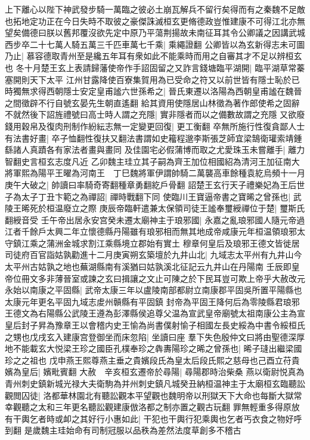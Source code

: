 上下離心以陛下神武發步騎一萬臨之彼必土崩瓦解兵不留行矣得而有之秦魏不足敵也拓地定功正在今日失時不取彼之豪傑誅滅桓玄更脩德政豈惟建康不可得江北亦無望矣備德曰朕以舊邦覆沒欲先定中原乃平蕩荆揚故未南征耳其令公卿議之因講武城西步卒二十七萬人騎五萬三千匹車萬七千乘|{
	乘繩證翻}
公卿皆以為玄新得志未可圖乃止|{
	慕容德取青州至是纔五年耳有衆如此不能乘時而用之自審其才不足以辨桓玄也}
冬十月楚王玄上表請歸藩使帝作手詔固留之又詐言錢塘臨平湖開|{
	臨平湖草常蓁塞開則天下太平}
江州甘露降使百寮集賀用為已受命之符又以前世皆有隱士恥於已時獨無求得西朝隱士安定皇甫謐六世孫希之|{
	晉氏東遷以洛陽為西朝皇甫謐在魏晉之間徵辟不行自號玄晏先生朝直遙翻}
給其資用使隱居山林徵為著作郎使希之固辭不就然後下詔旌禮號曰高士時人謂之充隱|{
	實非隱者而以之備數故謂之充隱}
又欲廢錢用穀帛及復肉刑制作紛紜志無一定變更回復|{
	更工衡翻}
卒無所施行性復貪鄙人士有法書好畫|{
	卒子恤翻性復扶又翻法書謂如史籕程邈李斯張芝師宜梁鵠衛瓘索靖鍾繇諸人真蹟各有家法者畫與畫同}
及佳園宅必假蒲博而取之尤愛珠玉未嘗離手|{
	離力智翻史言桓玄志度凡近}
乙卯魏主珪立其子嗣為齊王加位相國紹為清河王加征南大將軍熙為陽平王曜為河南王　丁巳魏將軍伊謂帥騎二萬襲高車餘種袁紇烏頻十一月庚午大破之|{
	帥讀曰率騎奇寄翻種章勇翻紇戶骨翻}
詔楚王玄行天子禮樂妃為王后世子為太子丁丑卞範之為禪詔|{
	禪時戰翻下同}
使臨川王寶逼帝書之寶晞之曾孫也|{
	武陵王晞死於桓温廢立之際}
庚辰帝臨軒遣兼太保領司徒王謐奉璽綬禪位于楚|{
	璽斯氏翻綬音受}
壬午帝出居永安宫癸未遷太廟神主于琅邪國|{
	永嘉之亂琅邪國人隨元帝過江者千餘戶太興二年立懷德縣丹陽雖有琅邪相而無其地成帝咸康元年桓温領琅邪太守鎮江乘之蒲洲金城求割江乘縣境立郡始有實土}
穆章何皇后及琅邪王德文皆徙居司徒府百官詣姑孰勸進十二月庚寅朔玄築壇於九井山北|{
	九域志太平州有九井山今太平州古姑孰之地也蕪湖縣南有溪猶曰姑孰溪北征記云九井山在丹陽南}
壬辰即皇帝位冊文多非薄晉室或諫之玄曰揖讓之文止可陳之於下民耳豈可欺上帝乎大赦改元永始以南康之平固縣|{
	武帝太康三年以盧陵南部都尉立南康郡平固吳所置平陽縣也太康元年更名平固九域志䖍州贑縣有平固鎮}
封帝為平固王降何后為零陵縣君琅邪王德文為右陽縣公武陵王遵為彭澤縣侯追尊父温為宣武皇帝廟號太祖南康公主為宣皇后封子昇為豫章王以會稽内史王愉為尚書僕射愉子相國左長史綏為中書令綏桓氏之甥也戊戌玄入建康宫登御坐而床忽陷|{
	坐讀曰座}
羣下失色殷仲文曰將由聖德深厚地不能載玄大悦梁王珍之國臣孔樸奉珍之犇夀陽珍之晞之曾孫也|{
	晞子㻱出繼梁國珍之之祖也}
戊申燕王熙尊燕主垂之貴嬪段氏為皇太后段氏熙之慈母也己酉立苻貴嬪為皇后|{
	嬪毗賓翻}
大赦　辛亥桓玄遷帝於尋陽|{
	尋陽郡時治柴桑}
燕以衛尉悦真為青州刺史鎮新城光禄大夫衛駒為并州刺史鎮凡城癸丑納桓温神主于太廟桓玄臨聽訟觀閲囚徒|{
	洛都華林園北有聽訟觀本平望觀也魏明帝以刑獄天下大命也每斷大獄常幸觀聽之太和三年更名聽訟觀建康倣洛都之制亦置之觀古玩翻}
罪無輕重多得原放有干輿乞者時或卹之其好行小惠如此|{
	干犯也干輿行犯乘輿也乞者丐衣食之物好呼到翻}
是歲魏主珪始命有司制冠服以品秩為差然法度草創多不稽古

